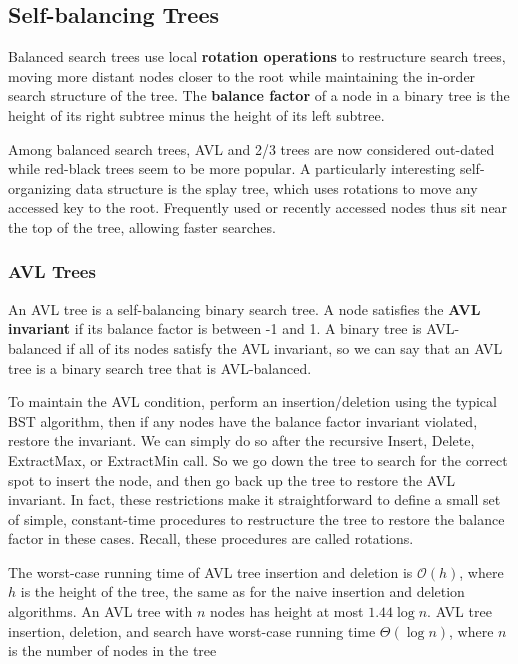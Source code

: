 \documentclass{article}
\newcommand{\bigO}{\mathcal{O}}
\begin{document}
    \subsection{Self-balancing Trees}
    Balanced search trees use local \textbf{rotation operations} to restructure search trees, moving more distant nodes closer to the root while maintaining the in-order search structure of the tree. The \textbf{balance factor} of a node in a binary tree is the height of its right subtree minus the height of its left subtree. 
    
    Among balanced search trees, AVL and 2/3 trees are now considered out-dated while red-black trees seem to be more popular. A particularly interesting self-organizing data structure is the splay tree, which uses rotations to move any accessed key to the root. Frequently used or recently accessed nodes thus sit near the top of the tree, allowing faster searches. 
    
    \subsubsection{AVL Trees}
    An AVL tree is a self-balancing binary search tree. A node satisfies the \textbf{AVL invariant} if its balance factor is between -1 and 1. A binary tree is AVL-balanced if all of its nodes satisfy the AVL invariant, so we can say that an AVL tree is a binary search tree that is AVL-balanced. 
    
    To maintain the AVL condition, perform an insertion/deletion using the typical BST algorithm, then if any nodes have the balance factor invariant violated, restore the invariant. We can simply do so after the recursive Insert, Delete, ExtractMax, or ExtractMin call. So we go down the tree to search for the correct spot to insert the node, and then go back up the tree to restore the AVL invariant. In fact, these restrictions make it straightforward to define a small set of simple, constant-time procedures to restructure the tree to restore the balance factor in these cases. Recall, these procedures are called rotations.
    
    The worst-case running time of AVL tree insertion and deletion is $\bigO(h)$, where $h$ is the height of the tree, the same as for the naive insertion and deletion algorithms. An AVL tree with $n$ nodes has height at most $1.44 \log n$. AVL tree insertion, deletion, and search have worst-case running time $\Theta(\log n)$, where $n$ is the number of nodes in the tree
    
\end{document}

